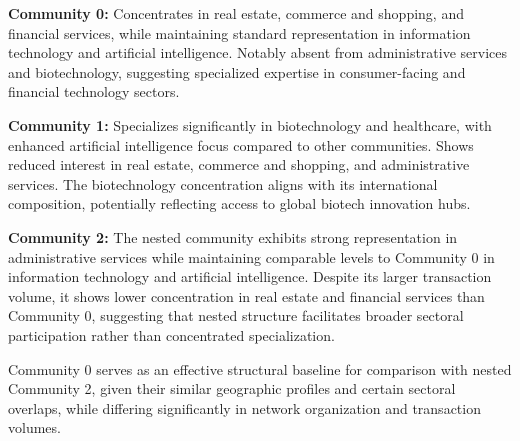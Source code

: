
\textbf{Community 0:} Concentrates in real estate, commerce and shopping, and financial services, while maintaining standard representation in information technology and artificial intelligence. Notably absent from administrative services and biotechnology, suggesting specialized expertise in consumer-facing and financial technology sectors.

\textbf{Community 1:} Specializes significantly in biotechnology and healthcare, with enhanced artificial intelligence focus compared to other communities. Shows reduced interest in real estate, commerce and shopping, and administrative services. The biotechnology concentration aligns with its international composition, potentially reflecting access to global biotech innovation hubs.

\textbf{Community 2:} The nested community exhibits strong representation in administrative services while maintaining comparable levels to Community 0 in information technology and artificial intelligence. Despite its larger transaction volume, it shows lower concentration in real estate and financial services than Community 0, suggesting that nested structure facilitates broader sectoral participation rather than concentrated specialization.

Community 0 serves as an effective structural baseline for comparison with nested Community 2, given their similar geographic profiles and certain sectoral overlaps, while differing significantly in network organization and transaction volumes.


